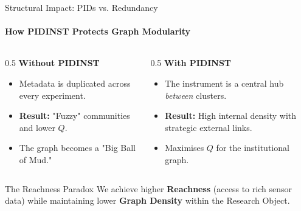 \documentclass[aspectratio=169]{beamer}
\begin{document}
\begin{frame}{Structural Impact: PIDs vs. Redundancy}
    \framesubtitle{How PIDINST Protects Graph Modularity}
    
    \begin{columns}[t]
        \begin{column}{0.5\textwidth}
            \textbf{Without PIDINST}
            \begin{itemize}
                \item Metadata is duplicated across every experiment.
                \item \textbf{Result:} "Fuzzy" communities and lower $Q$.
                \item The graph becomes a "Big Ball of Mud."
            \end{itemize}
        \end{column}
        \begin{column}{0.5\textwidth}
            \textbf{With PIDINST}
            \begin{itemize}
                \item The instrument is a central hub \textit{between} clusters.
                \item \textbf{Result:} High internal density with strategic external links.
                \item Maximises $Q$ for the institutional graph.
            \end{itemize}
        \end{column}
    \end{columns}

    \begin{exampleblock}{The Reachness Paradox}
        We achieve higher \textbf{Reachness} (access to rich sensor data) while maintaining lower \textbf{Graph Density} within the Research Object.
    \end{exampleblock}
\end{frame}
\end{document}
